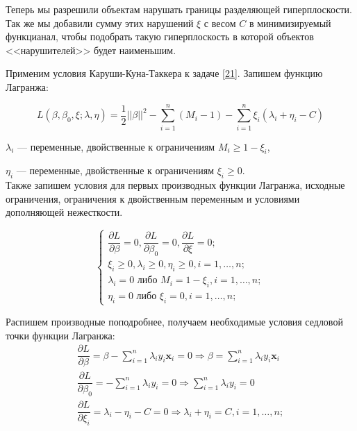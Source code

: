 \documentclass[11pt, oneside]{article}   	%
\begin{document}
Теперь мы разрешили объектам нарушать границы разделяющей гиперплоскости. Так же мы добавили сумму этих нарушений $\xi$ с весом $C$ в минимизируемый функцианал, чтобы подобрать такую гиперплоскость в которой объектов <<нарушителей>> будет наименьшим.

Применим условия Каруши-Куна-Таккера к задаче \ref{21}. Запишем функцию Лагранжа:

\begin{equation}
	L(\beta, \beta_0, \xi; \lambda, \eta) =  \frac{1}{2} ||\beta||^2 - \sum\limits_{i=1}^{n}(M_i - 1) - \sum\limits_{i=1}^{n} \xi_i(\lambda_i + \eta_i - C)
	\label{22}
\end{equation}

$\lambda_i$ --- переменные, двойственные к ограничениям $M_i \geqslant 1 - \xi_i$,

$\eta_i$ --- переменные, двойственные к ограничениям $\xi_i \geqslant 0 $.\\


Также запишем условия для первых производных функции Лагранжа, исходные ограничения, ограничения к двойственным переменным и условиями дополняющей нежесткости.

\begin{equation}
	\begin{cases}
		\dfrac{\partial L}{\partial \beta} = 0, \dfrac{\partial L}{\partial \beta_0} = 0, \dfrac{\partial L}{\partial \xi} = 0; \\
		\xi_i \geqslant 0, \lambda_i \geqslant 0, \eta_i \geqslant 0, i = 1, \dotsc, n; \\
		\lambda_i = 0 \text{ либо } M_i = 1 - \xi_i, i = 1, \dotsc, n; \\
		\eta_i = 0 \text{ либо } \xi_i = 0, i = 1, \dotsc, n;
	\end{cases}
	\label{23}
\end{equation}

Распишем производные поподробнее, получаем необходимые условия седловой точки функции Лагранжа:
\begin{equation}
	\begin{split}
 	\dfrac{\partial L}{\partial \beta} = \beta - \sum\limits_{i=1}^{n}\lambda_i y_i \bm{x}_i = 0 \Longrightarrow \beta = \sum\limits_{i=1}^{n}\lambda_i y_i \bm{x}_i \\
 	\dfrac{\partial L}{\partial \beta_0} = - \sum\limits_{i=1}^{n}\lambda_i y_i = 0 \Longrightarrow \sum\limits_{i=1}^{n}\lambda_i y_i = 0 \\
 	\dfrac{\partial L}{\partial \xi_i} = \lambda_i - \eta_i - C = 0 \Longrightarrow \lambda_i + \eta_i = C, i = 1, \dotsc, n; 
 	\end{split}
 	\label{24}
\end{equation}
\end{document}
